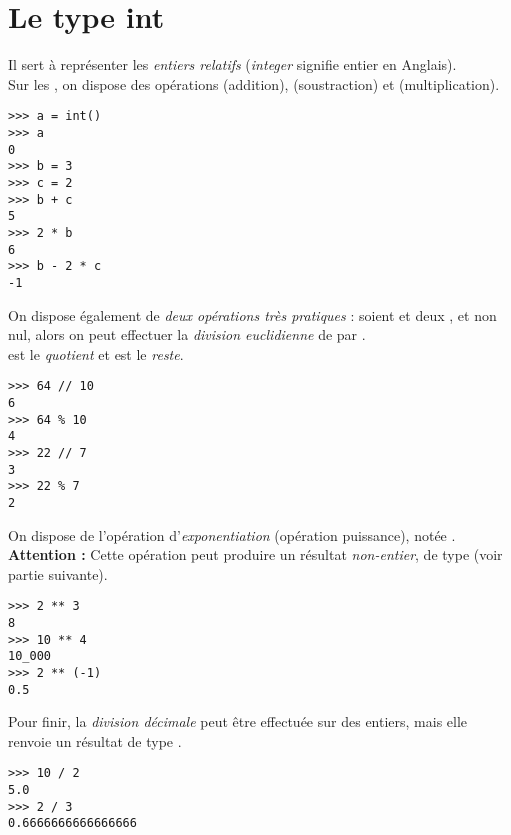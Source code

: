 \section{Le type int}
Il sert à représenter les \textit{entiers relatifs} (\textit{integer} signifie \og entier \fg{} en Anglais).\\
Sur les , on dispose des opérations \pythoninline{+} (addition), \pythoninline{-} (soustraction) et \pythoninline{*} (multiplication).

\begin{pys}\begin{verbatim}
>>> a = int()
>>> a
0
>>> b = 3
>>> c = 2
>>> b + c
5
>>> 2 * b
6
>>> b - 2 * c
-1
\end{verbatim}
\end{pys}

On dispose également de \textit{deux opérations très pratiques} : soient  et  deux , et  non nul, alors on peut effectuer
la \textit{division euclidienne} de  par .\\
 est le \textit{quotient} et  est le \textit{reste}.

\begin{pys}\begin{verbatim}
>>> 64 // 10
6
>>> 64 % 10
4
>>> 22 // 7
3
>>> 22 % 7
2
\end{verbatim}
\end{pys}



On dispose de l'opération d'\textit{exponentiation} (opération puissance), notée \pythoninline{**}.\\
\textbf{Attention :} Cette opération peut produire un résultat \textit{non-entier}, de type  (voir partie suivante).

\begin{pys}\begin{verbatim}
>>> 2 ** 3
8
>>> 10 ** 4
10_000
>>> 2 ** (-1)
0.5
\end{verbatim}
\end{pys}

Pour finir, la \textit{division décimale} peut être effectuée sur des entiers, mais elle renvoie un résultat de type .

\begin{pys}\begin{verbatim}
>>> 10 / 2
5.0
>>> 2 / 3
0.6666666666666666
\end{verbatim}
\end{pys}

